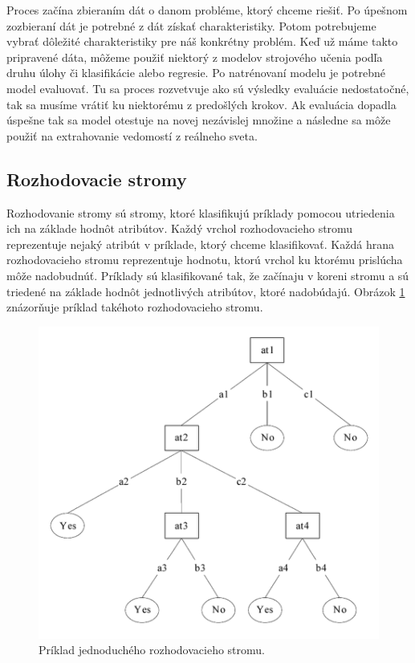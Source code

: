 Proces začína zbieraním dát o danom probléme, ktorý chceme riešiť. Po úpešnom zozbieraní dát je potrebné z dát získať charakteristiky. Potom potrebujeme vybrať dôležité charakteristiky pre náš konkrétny problém. Keď už máme takto pripravené dáta, môžeme použiť niektorý z modelov strojového učenia podľa druhu úlohy či klasifikácie alebo regresie. Po natrénovaní modelu je potrebné model evaluovať. Tu sa proces rozvetvuje ako sú výsledky evaluácie nedostatočné, tak sa musíme vrátiť ku niektorému z predošlých krokov. Ak evaluácia dopadla úspešne tak sa model otestuje na novej nezávislej množine a následne sa môže použiť na extrahovanie vedomostí z reálneho sveta.
\subsection{Rozhodovacie stromy}
Rozhodovanie stromy sú stromy, ktoré klasifikujú príklady pomocou utriedenia ich na základe hodnôt atribútov. Každý vrchol rozhodovacieho stromu reprezentuje nejaký atribút v príklade, ktorý chceme klasifikovať. Každá hrana rozhodovacieho stromu reprezentuje hodnotu, ktorú vrchol ku ktorému prislúcha môže nadobudnúť. Príklady sú klasifikované tak, že začínaju v koreni stromu a sú triedené na základe hodnôt jednotlivých atribútov, ktoré nadobúdajú. Obrázok \ref{img:decision_tree} znázorňuje príklad takéhoto rozhodovacieho stromu.
\begin{figure}[H]
	\begin{center}
		\includegraphics[scale=0.5]{img/decision_tree.png}
		\caption{Príklad jednoduchého rozhodovacieho stromu.}
		\label{img:decision_tree}
	\end{center}
\end{figure}
